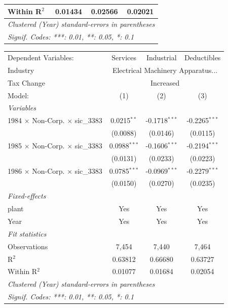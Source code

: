 \documentclass[
  12pt]{article}
\theoremstyle{definition}
\theoremstyle{remark}
\begin{document}
\begin{table}
\begin{minipage}{\linewidth}
\begin{tabular}{lccc}
   Within R$^2$                                  & 0.01434        & 0.02566         & 0.02021\\  
   \midrule \midrule
   \multicolumn{4}{l}{\emph{Clustered (Year) standard-errors in parentheses}}\\
   \multicolumn{4}{l}{\emph{Signif. Codes: ***: 0.01, **: 0.05, *: 0.1}}\\
\end{tabular}
\par\endgroup
\begingroup
\centering
\begin{tabular}{lccc}
   \tabularnewline \midrule \midrule
   Dependent Variables:                          & Services       & Industrial      & Deductibles\\  
   Industry & \multicolumn{3}{c}{Electrical Machinery Apparatus...} \\ 
   Tax Change & \multicolumn{3}{c}{Increased} \\ 
   Model:                                        & (1)            & (2)             & (3)\\  
   \midrule
   \emph{Variables}\\
   1984 $\times$ Non-Corp. $\times$ sic\_3383    & 0.0215$^{**}$  & -0.1718$^{***}$ & -0.2265$^{***}$\\   
                                                 & (0.0088)       & (0.0146)        & (0.0115)\\   
   1985 $\times$ Non-Corp. $\times$ sic\_3383    & 0.0988$^{***}$ & -0.1606$^{***}$ & -0.2194$^{***}$\\   
                                                 & (0.0131)       & (0.0233)        & (0.0223)\\   
   1986 $\times$ Non-Corp. $\times$ sic\_3383    & 0.0785$^{***}$ & -0.0969$^{***}$ & -0.2279$^{***}$\\   
                                                 & (0.0150)       & (0.0270)        & (0.0235)\\   
   \midrule
   \emph{Fixed-effects}\\
   plant                                         & Yes            & Yes             & Yes\\  
   Year                                          & Yes            & Yes             & Yes\\  
   \midrule
   \emph{Fit statistics}\\
   Observations                                  & 7,454          & 7,440           & 7,464\\  
   R$^2$                                         & 0.63812        & 0.66680         & 0.63727\\  
   Within R$^2$                                  & 0.01077        & 0.01684         & 0.02054\\  
   \midrule \midrule
   \multicolumn{4}{l}{\emph{Clustered (Year) standard-errors in parentheses}}\\
   \multicolumn{4}{l}{\emph{Signif. Codes: ***: 0.01, **: 0.05, *: 0.1}}\\
\end{tabular}
\par\endgroup


\end{minipage}
\end{table}
\end{document}
